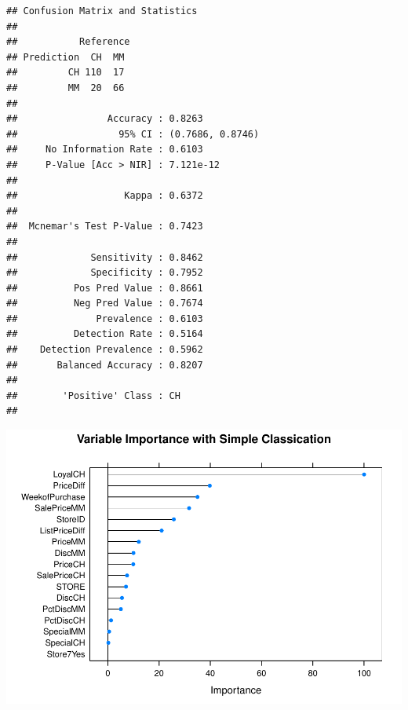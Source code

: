\documentclass[]{book}
\newenvironment{Shaded}{\begin{snugshade}}{\end{snugshade}}
\newcommand{\CommentTok}[1]{\textcolor[rgb]{0.56,0.35,0.01}{\textit{#1}}}
\newcommand{\DataTypeTok}[1]{\textcolor[rgb]{0.13,0.29,0.53}{#1}}
\newcommand{\DecValTok}[1]{\textcolor[rgb]{0.00,0.00,0.81}{#1}}
\newcommand{\KeywordTok}[1]{\textcolor[rgb]{0.13,0.29,0.53}{\textbf{#1}}}
\newcommand{\NormalTok}[1]{#1}
\newcommand{\OperatorTok}[1]{\textcolor[rgb]{0.81,0.36,0.00}{\textbf{#1}}}
\newcommand{\StringTok}[1]{\textcolor[rgb]{0.31,0.60,0.02}{#1}}
\begin{document}
\begin{verbatim}
## Confusion Matrix and Statistics
## 
##           Reference
## Prediction  CH  MM
##         CH 110  17
##         MM  20  66
##                                           
##                Accuracy : 0.8263          
##                  95% CI : (0.7686, 0.8746)
##     No Information Rate : 0.6103          
##     P-Value [Acc > NIR] : 7.121e-12       
##                                           
##                   Kappa : 0.6372          
##                                           
##  Mcnemar's Test P-Value : 0.7423          
##                                           
##             Sensitivity : 0.8462          
##             Specificity : 0.7952          
##          Pos Pred Value : 0.8661          
##          Neg Pred Value : 0.7674          
##              Prevalence : 0.6103          
##          Detection Rate : 0.5164          
##    Detection Prevalence : 0.5962          
##       Balanced Accuracy : 0.8207          
##                                           
##        'Positive' Class : CH              
## 
\end{verbatim}

\begin{Shaded}
\end{Shaded}

\includegraphics{data-sci_files/figure-latex/unnamed-chunk-80-2.pdf}
\end{document}

